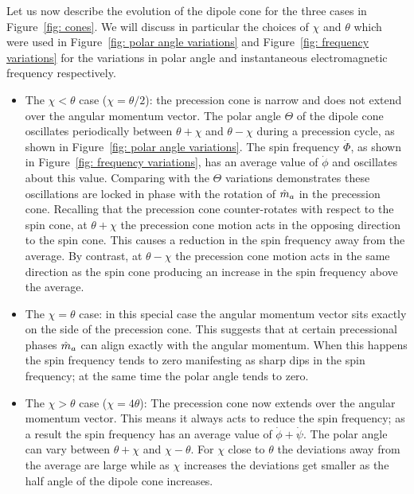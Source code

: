 \documentclass[../full_thesis/full_thesis.tex]{subfiles}
\begin{document}
Let us now describe
the evolution of the dipole cone for the three cases in Figure~\ref{fig: cones}.
We will discuss in particular the choices of $\chi$ and $\theta$ which were used
in Figure~\ref{fig: polar angle variations} and Figure~\ref{fig: frequency variations}
for the variations in polar angle and instantaneous electromagnetic frequency
respectively.
\begin{itemize}
\item The $\chi < \theta$ case ($\chi = \theta/2$): the precession cone is
narrow and does not extend over the angular momentum vector. The polar angle
$\Theta$ of the dipole cone oscillates periodically between $\theta+\chi$ and
$\theta-\chi$ during a precession cycle, as shown in Figure~\ref{fig: polar angle
variations}.  The spin frequency $\dot{\Phi}$, as shown in Figure~\ref{fig: frequency
variations}, has an average value of $\dot{\phi}$ and oscillates about this
value. Comparing with the $\Theta$ variations demonstrates these oscillations
are locked in phase with the rotation of $\hat{m}_a$ in the precession cone. Recalling
that the precession cone counter-rotates with respect to the spin cone, at
$\theta+\chi$ the precession cone motion acts in the opposing direction to the
spin cone. This causes a reduction in the spin frequency away from the average.
By contrast, at $\theta-\chi$ the precession cone motion acts in the same
direction as the spin cone producing an increase in the spin frequency above
the average.

\item The $\chi = \theta$ case: in this special case the angular momentum vector sits exactly
on the side of the precession cone. This suggests that at certain precessional phases $\hat{m}_a$ can align exactly with
the angular momentum. When this happens the spin frequency tends to zero manifesting as sharp dips in the
spin frequency; at the same time the polar angle tends to zero.

\item The $\chi > \theta$ case ($\chi = 4\theta$): The precession cone now extends over the
angular momentum vector. This means it always acts to reduce the spin
frequency; as a result the spin frequency has an average value of
$\dot{\phi} + \dot{\psi}$. The polar angle can vary between $\theta+\chi$ and
$\chi-\theta$. For $\chi$ close to $\theta$ the deviations away from the
average are large while as $\chi$ increases the deviations get smaller as
the half angle of the dipole cone increases.
\end{itemize}
\end{document}
